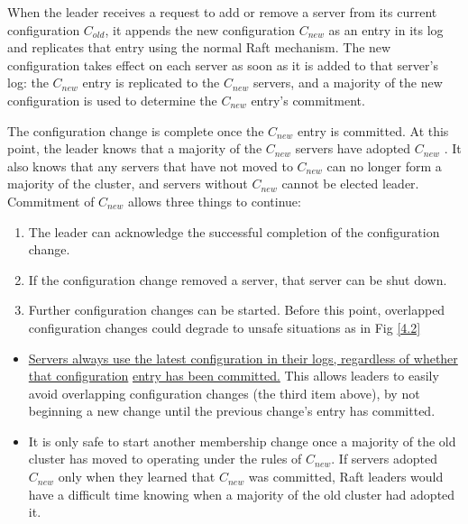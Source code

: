 \documentclass[11pt]{article}
\begin{document}
When the leader receives a request to add or remove a server from its current configuration
\(C_{old}\), it appends the new configuration \(C_{new}\)  as an entry in its log and replicates that
entry using the normal Raft mechanism. The new configuration takes effect on each server as soon as it
is added to that server’s log: the \(C_{new}\) entry is replicated to the \(C_{new}\) servers, and a majority of the new
configuration is used to determine the \(C_{new}\) entry’s commitment.

The configuration change is complete once the \(C_{new}\) entry is committed. At this point, the leader knows
that a majority of the \(C_{new}\) servers have adopted \(C_{new}\) . It also knows that any servers that have not
moved to \(C_{new}\) can no longer form a majority of the cluster, and servers without \(C_{new}\) cannot be elected
leader. Commitment of \(C_{new}\) allows three things to continue:
\begin{enumerate}
\item The leader can acknowledge the successful completion of the configuration change.
\item If the configuration change removed a server, that server can be shut down.
\item Further configuration changes can be started. Before this point, overlapped configuration changes
could degrade to unsafe situations as in Fig \ref{4.2}
\end{enumerate}



\begin{itemize}
\item \uline{Servers always use the latest configuration in their logs, regardless of whether that configuration}
\uline{entry has been committed.} This allows leaders to easily avoid overlapping configuration changes (the
third item above), by not beginning a new change until the previous change’s entry has committed.
\item It is only safe to start another membership change once a majority of the old cluster has moved to
operating under the rules of \(C_{new}\). If servers adopted \(C_{new}\) only when they learned that \(C_{new}\)
was committed, Raft leaders would have a difficult time knowing when a majority of the old cluster
had adopted it.
\end{itemize}
\end{document}
